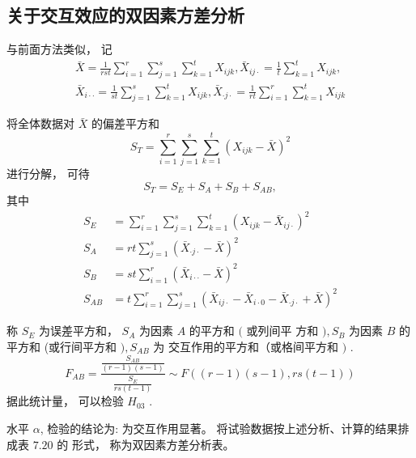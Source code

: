 \subsection{关于交互效应的双因素方差分析}

与前面方法类似， 记
\begin{equation}
\begin{array}{l}
\bar{X}=\frac{1}{r s t} \sum_{i=1}^{r} \sum_{j=1}^{s} \sum_{k=1}^{t} X_{i j k}, \bar{X}_{i j \cdot}=\frac{1}{t} \sum_{k=1}^{t} X_{i j k}, \\
\bar{X}_{i \cdot \cdot}=\frac{1}{s t} \sum_{j=1}^{s} \sum_{k=1}^{t} X_{i j k}, \bar{X}_{\cdot j \cdot}=\frac{1}{r t} \sum_{i=1}^{r} \sum_{k=1}^{t} X_{i j k}
\end{array}
\end{equation}

将全体数据对 $  \bar{X}  $ 的偏差平方和
\begin{equation}
S_{T}=\sum_{i=1}^{r} \sum_{j=1}^{s} \sum_{k=1}^{t}\left(X_{i j k}-\bar{X}\right)^{2}
\end{equation}
进行分解， 可待
\begin{equation}
S_{T}=S_{E}+S_{A}+S_{B}+S_{A B},
\end{equation}
其中
\begin{equation}
\begin{aligned}
S_{E} &=\sum_{i=1}^{r} \sum_{j=1}^{s} \sum_{k=1}^{t}\left(X_{i j k}-\bar{X}_{i j \cdot}\right)^{2} \\
S_{A} &=r t \sum_{j=1}^{s}\left(\bar{X}_{\cdot j \cdot}-\bar{X}\right)^{2} \\
S_{B} &=s t \sum_{i=1}^{r}\left(\bar{X}_{i \cdot \cdot}-\bar{X}\right)^{2} \\
S_{A B} &=t \sum_{i=1}^{r} \sum_{j=1}^{s}\left(\bar{X}_{i j \cdot}-\bar{X}_{i \cdot 0}-\bar{X}_{\cdot j \cdot}+\bar{X}\right)^{2}
\end{aligned}
\end{equation}

称 $  S_{E}  $ 为误差平方和，  $  {S}_{A}  $ 为因素 $  {A}  $ 的平方和 $  (  $ 或列间平 方和 $  ), S_{B}  $ 为因素 $  B  $ 的平方和 (或行间平方和 $  ), S_{A B}  $ 为 交互作用的平方和（或格间平方和 $  )  $ . 
\begin{equation}
F_{A B}=\frac{\frac{S_{A B}}{(r-1)(s-1)}}{\frac{S_{E}}{r s(t-1)}} \sim F((r-1)(s-1), r s(t-1))
\end{equation}
据此统计量， 可以检验 $  {H}_{03}  $ . 

水平 $  \alpha  $, 检验的结论为:
为交互作用显著。 
将试验数据按上述分析、计算的结果排成表 $  7.20  $ 的
形式， 称为双因素方差分析表。 

